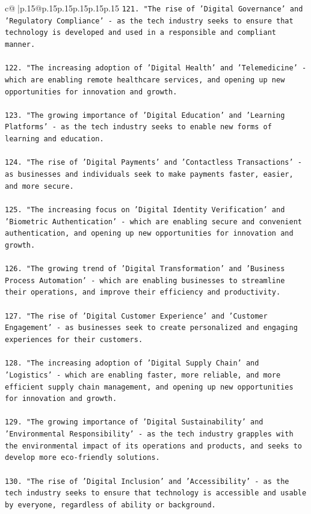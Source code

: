 \documentclass{article}
\begin{document}
{\begin{supertabular}{c@{$\;$}|p{.15\linewidth}@{}p{.15\linewidth}p{.15\linewidth}p{.15\linewidth}p{.15\linewidth}p{.15\linewidth}}
{{{\texttt{121. "The rise of 'Digital Governance' and 'Regulatory Compliance' {-} as the tech industry seeks to ensure that technology is developed and used in a responsible and compliant manner.} \\
\\ 
\texttt{122. "The increasing adoption of 'Digital Health' and 'Telemedicine' {-} which are enabling remote healthcare services, and opening up new opportunities for innovation and growth.} \\
\\ 
\texttt{123. "The growing importance of 'Digital Education' and 'Learning Platforms' {-} as the tech industry seeks to enable new forms of learning and education.} \\
\\ 
\texttt{124. "The rise of 'Digital Payments' and 'Contactless Transactions' {-} as businesses and individuals seek to make payments faster, easier, and more secure.} \\
\\ 
\texttt{125. "The increasing focus on 'Digital Identity Verification' and 'Biometric Authentication' {-} which are enabling secure and convenient authentication, and opening up new opportunities for innovation and growth.} \\
\\ 
\texttt{126. "The growing trend of 'Digital Transformation' and 'Business Process Automation' {-} which are enabling businesses to streamline their operations, and improve their efficiency and productivity.} \\
\\ 
\texttt{127. "The rise of 'Digital Customer Experience' and 'Customer Engagement' {-} as businesses seek to create personalized and engaging experiences for their customers.} \\
\\ 
\texttt{128. "The increasing adoption of 'Digital Supply Chain' and 'Logistics' {-} which are enabling faster, more reliable, and more efficient supply chain management, and opening up new opportunities for innovation and growth.} \\
\\ 
\texttt{129. "The growing importance of 'Digital Sustainability' and 'Environmental Responsibility' {-} as the tech industry grapples with the environmental impact of its operations and products, and seeks to develop more eco{-}friendly solutions.} \\
\\ 
\texttt{130. "The rise of 'Digital Inclusion' and 'Accessibility' {-} as the tech industry seeks to ensure that technology is accessible and usable by everyone, regardless of ability or background.} \\
}}}
\end{supertabular}}
\end{document}
